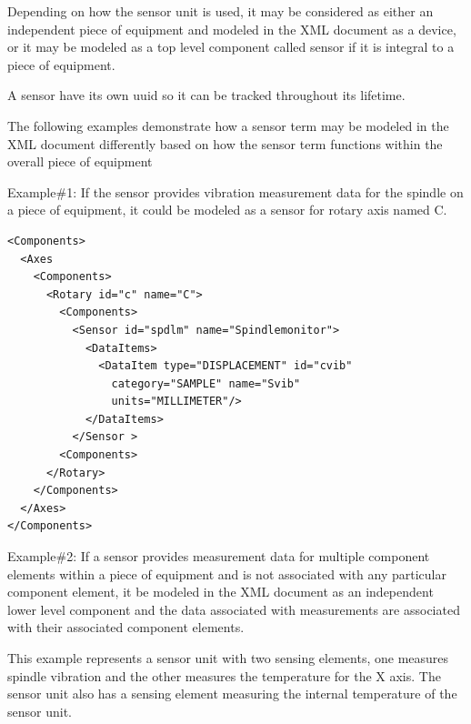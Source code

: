\documentclass{mtconnect}	%
\begin{document}
Depending on how the \gls{sensor unit} is used, it may be considered as either an independent piece of equipment and modeled in the XML document as a \gls{device}, or it may be modeled as a \gls{top level} \gls{component} called \gls{sensor} if it is integral to a piece of equipment.

A \gls{sensor} \may have its own \gls{uuid} so it can be tracked throughout its lifetime.

The following examples demonstrate how a \gls{sensor term} may be modeled in the XML document differently based on how the \gls{sensor term} functions within the overall piece of equipment

Example\#1:   If the \gls{sensor} provides vibration measurement data for the spindle on a piece of equipment, it could be modeled as a \gls{sensor} for rotary axis named C.

\begin{lstlisting}[firstnumber=1,escapechar=|,%
    caption={Example of Sensor for rotary axis}, label={lst:example-of-sensor}]
<Components>
  <Axes
    <Components>
      <Rotary id="c" name="C">
        <Components>
          <Sensor id="spdlm" name="Spindlemonitor">
            <DataItems>
              <DataItem type="DISPLACEMENT" id="cvib"
                category="SAMPLE" name="Svib" 
                units="MILLIMETER"/>
            </DataItems>
          </Sensor >
        <Components>
      </Rotary>
    </Components>
  </Axes>
</Components>
\end{lstlisting}

Example\#2:   If a \gls{sensor} provides measurement data for multiple \gls{component} elements within a piece of equipment and is not associated with any particular \gls{component} element, it \may be modeled in the XML document as an independent \gls{lower level} \gls{component} and the data associated with measurements are associated with their associated \gls{component} elements.

This example represents a \gls{sensor unit} with two \glspl{sensing element}, one measures spindle vibration and the other measures the temperature for the X axis.   The \gls{sensor unit} also has a \gls{sensing element} measuring the internal temperature of the \gls{sensor unit}.
\end{document}
